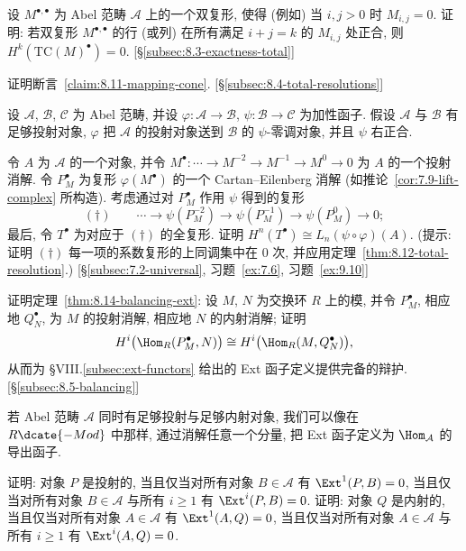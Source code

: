 \begin{prob}\label{ex:8.6}
设 $M^{\bullet,\bullet}$ 为 Abel 范畴 $\mathcal{A}$ 上的一个双复形, 使得 (例如) 当 $i,j>0$ 时 $M_{i,j}=0$. 证明: 若双复形 $M^{\bullet,\bullet}$ 的行 (或列) 在所有满足 $i+j=k$ 的 $M_{i,j}$ 处正合, 则 $H^k(\mathrm{TC}(M)^\bullet)=0$. [\S\ref{subsec:8.3-exactness-total}]
\end{prob}

\begin{prob}\label{ex:8.7}
证明断言~\ref{claim:8.11-mapping-cone}. [\S\ref{subsec:8.4-total-resolutions}]
\end{prob}

\begin{prob}\label{ex:8.8}
设 $\mathcal{A}$, $\mathcal{B}$, $\mathcal{C}$ 为 Abel 范畴, 并设 $\varphi:\mathcal{A}\to\mathcal{B}$, $\psi:\mathcal{B}\to\mathcal{C}$ 为加性函子. 假设 $\mathcal{A}$ 与 $\mathcal{B}$ 有足够投射对象, $\varphi$ 把 $\mathcal{A}$ 的投射对象送到 $\mathcal{B}$ 的 $\psi$-零调对象, 并且 $\psi$ 右正合.

令 $A$ 为 $\mathcal{A}$ 的一个对象, 并令 $M^\bullet:\cdots\to M^{-2}\to M^{-1}\to M^0\to 0$ 为 $A$ 的一个投射消解. 令 $P_M^\bullet$ 为复形 $\varphi(M^\bullet)$ 的一个 Cartan--Eilenberg 消解 (如推论~\ref{cor:7.9-lift-complex} 所构造). 考虑通过对 $P_M^\bullet$ 作用 $\psi$ 得到的复形
\[
(\dagger)\qquad \cdots \longrightarrow \psi(P_M^{-2})\longrightarrow \psi(P_M^{-1})\longrightarrow \psi(P_M^0)\longrightarrow 0;
\]
最后, 令 $T^\bullet$ 为对应于 $(\dagger)$ 的全复形. 证明 $H^n(T^\bullet)\cong L_n(\psi\circ\varphi)(A)$. (提示: 证明 $(\dagger)$ 每一项的系数复形的上同调集中在 $0$ 次, 并应用定理~\ref{thm:8.12-total-resolution}.) [\S\ref{subsec:7.2-universal}, 习题~\ref{ex:7.6}, 习题~\ref{ex:9.10}]
\end{prob}

\begin{prob}\label{ex:8.9}
证明定理~\ref{thm:8.14-balancing-ext}: 设 $M$, $N$ 为交换环 $R$ 上的模, 并令 $P_M^\bullet$, 相应地 $Q_N^\bullet$, 为 $M$ 的投射消解, 相应地 $N$ 的内射消解; 证明
\[
H^i\bigl(\Hom_R(P_M^\bullet, N)\bigr)\cong H^i\bigl(\Hom_R(M, Q_N^\bullet)\bigr),
\]
从而为 §VIII.\ref{subsec:ext-functors} 给出的 Ext 函子定义提供完备的辩护. [\S\ref{subsec:8.5-balancing}]
\end{prob}

\begin{prob}\label{ex:8.10}
若 Abel 范畴 $\mathcal{A}$ 同时有足够投射与足够内射对象, 我们可以像在 $R\dcate{-Mod}$ 中那样, 通过消解任意一个分量, 把 Ext 函子定义为 $\Hom_{\mathcal{A}}$ 的导出函子.

证明: 对象 $P$ 是投射的, 当且仅当对所有对象 $B\in\mathcal{A}$ 有 $\Ext^1(P,B)=0$, 当且仅当对所有对象 $B\in\mathcal{A}$ 与所有 $i\ge 1$ 有 $\Ext^i(P,B)=0$. 证明: 对象 $Q$ 是内射的, 当且仅当对所有对象 $A\in\mathcal{A}$ 有 $\Ext^1(A,Q)=0$, 当且仅当对所有对象 $A\in\mathcal{A}$ 与所有 $i\ge 1$ 有 $\Ext^i(A,Q)=0$.
\end{prob}

